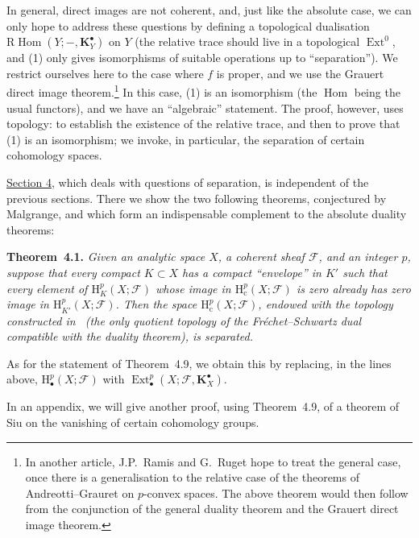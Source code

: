 \documentclass[british]{article}
\newenvironment{itenv}[1]
  {\phantomsection\par\smallskip\noindent\textbf{#1.}\itshape}
  {\par\smallskip}
\newcommand{\oldpage}[1]{\marginpar{\footnotesize$\Big\vert$ \textit{p.~#1}}}
\begin{document}
In general, direct images are not coherent, and, just like the absolute
case, we can only hope to address these questions by defining a
topological dualisation
\(\mathrm{R}\operatorname{Hom}(Y;-,\mathbf{K}_Y^\bullet)\) on \(Y\) (the
relative trace should live in a topological \(\operatorname{Ext}^0\),
and (1) only gives isomorphisms of suitable operations up to
``separation''). We restrict ourselves here to the case where \(f\) is
proper, and we use the Grauert direct image theorem.\footnote{In another
  article, J.P.~Ramis and G.~Ruget hope to treat the general case, once
  there is a generalisation to the relative case of the theorems of
  Andreotti--Grauret on \(p\)-convex spaces. The above theorem would
  then follow from the conjunction of the general duality theorem and
  the Grauert direct image theorem.} In this case, (1) is an isomorphism
(the \(\operatorname{Hom}\) being the usual functors), and we have an
``algebraic'' statement. \oldpage{262} The proof, however, uses
topology: to establish the existence of the relative trace, and then to
prove that (1) is an isomorphism; we invoke, in particular, the
separation of certain cohomology spaces.

\hyperref[section-4]{Section 4}, which deals with questions of
separation, is independent of the previous sections. There we show the
two following theorems, conjectured by Malgrange, and which form an
indispensable complement to the absolute duality theorems:

\begin{itenv}{Theorem 4.1}
Given an analytic space \(X\), a coherent sheaf \({\mathscr{F}}\), and
an integer \(p\), suppose that every compact \(K\subset X\) has a
compact ``envelope'' in \(K'\) such that every element of
\(\mathrm{H}_K^p(X;{\mathscr{F}})\) whose image in
\(\mathrm{H}_\mathrm{c}^p(X;{\mathscr{F}})\) is zero already has zero
image in \(\mathrm{H}_{K'}^p(X;{\mathscr{F}})\). Then the space
\(\mathrm{H}_\mathrm{c}^p(X;{\mathscr{F}})\), endowed with the topology
constructed in \autocite{10}~(the only quotient topology of the
Fréchet--Schwartz dual compatible with the duality theorem), is
separated.

\end{itenv}

As for the statement of Theorem~4.9, we obtain this by replacing, in the
lines above, \(\mathrm{H}_\bullet^p(X;{\mathscr{F}})\) with
\(\operatorname{Ext}_\bullet^p(X;{\mathscr{F}},\mathbf{K}_X^\bullet)\).

In an appendix, we will give another proof, using Theorem~4.9, of a
theorem of Siu on the vanishing of certain cohomology groups.
\end{document}
